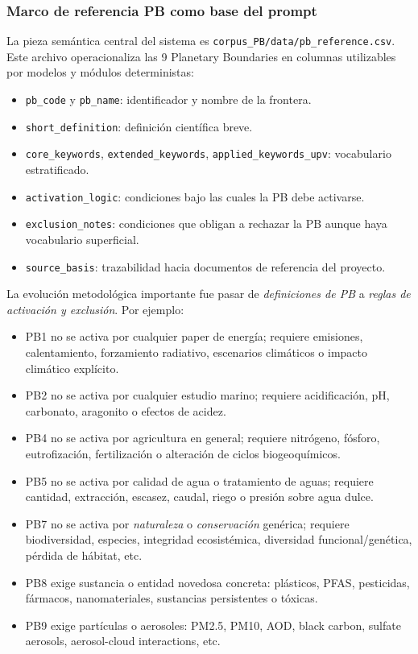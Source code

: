 \subsubsection*{Marco de referencia PB como base del prompt}

La pieza semántica central del sistema es \texttt{corpus\_PB/data/pb\_reference.csv}. Este archivo operacionaliza las 9 Planetary Boundaries en columnas utilizables por modelos y módulos deterministas:

\begin{itemize}
\item \texttt{pb\_code} y \texttt{pb\_name}: identificador y nombre de la frontera.
\item \texttt{short\_definition}: definición científica breve.
\item \texttt{core\_keywords}, \texttt{extended\_keywords}, \texttt{applied\_keywords\_upv}: vocabulario estratificado.
\item \texttt{activation\_logic}: condiciones bajo las cuales la PB debe activarse.
\item \texttt{exclusion\_notes}: condiciones que obligan a rechazar la PB aunque haya vocabulario superficial.
\item \texttt{source\_basis}: trazabilidad hacia documentos de referencia del proyecto.
\end{itemize}

La evolución metodológica importante fue pasar de \emph{definiciones de PB} a \emph{reglas de activación y exclusión}. Por ejemplo:

\begin{itemize}
\item PB1 no se activa por cualquier paper de energía; requiere emisiones, calentamiento, forzamiento radiativo, escenarios climáticos o impacto climático explícito.
\item PB2 no se activa por cualquier estudio marino; requiere acidificación, pH, carbonato, aragonito o efectos de acidez.
\item PB4 no se activa por agricultura en general; requiere nitrógeno, fósforo, eutrofización, fertilización o alteración de ciclos biogeoquímicos.
\item PB5 no se activa por calidad de agua o tratamiento de aguas; requiere cantidad, extracción, escasez, caudal, riego o presión sobre agua dulce.
\item PB7 no se activa por \emph{naturaleza} o \emph{conservación} genérica; requiere biodiversidad, especies, integridad ecosistémica, diversidad funcional/genética, pérdida de hábitat, etc.
\item PB8 exige sustancia o entidad novedosa concreta: plásticos, PFAS, pesticidas, fármacos, nanomateriales, sustancias persistentes o tóxicas.
\item PB9 exige partículas o aerosoles: PM2.5, PM10, AOD, black carbon, sulfate aerosols, aerosol-cloud interactions, etc.
\end{itemize}

